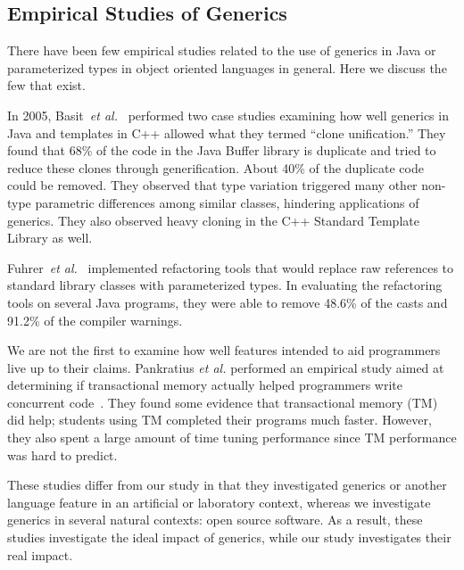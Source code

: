 \documentclass{svjour3}
\newcommand{\etal}{\emph{et al.}\xspace}
\begin{document}
\subsection{Empirical Studies of Generics}

\noindent
There have been few empirical studies related to the use of generics in Java or
parameterized types in object oriented languages in general.  Here we discuss
the few that exist.

In 2005, Basit~\etal~\cite{basit2005empirical} performed two case studies
examining how well generics in Java and templates in C++ allowed what they
termed ``clone unification.'' They found that 68\% of the code in the Java
Buffer library is duplicate and tried to reduce these clones through
generification.  About 40\% of the duplicate code could be
removed.  They observed that type variation triggered many other non-type
parametric differences among similar classes, hindering applications of
generics.  They also observed heavy cloning in the C++ Standard Template Library as well.

Fuhrer~\etal~\cite{fuhrer2005efficiently} implemented refactoring tools 
that would replace raw references to standard library classes with
parameterized types.
In evaluating the refactoring tools on several Java
programs, they were able to remove 48.6\% of the casts and 91.2\% of the
compiler warnings.

We are not the first to examine how well features intended to aid programmers
live up to their claims.  Pankratius \etal performed an empirical study aimed
at determining if transactional memory actually helped programmers write
concurrent code~\cite{pankratius2009does}.  They found some evidence
that transactional memory (TM) did help; students using TM completed
their programs much faster.  However, they also spent a large amount of time
tuning performance since TM performance was hard to predict.  

These studies differ from our study in that they investigated generics or another language feature 
in an artificial or laboratory context, whereas we investigate generics in several natural
contexts: open source software. As a result, these studies investigate the ideal impact of generics,
while our study investigates their real impact.
\end{document}
